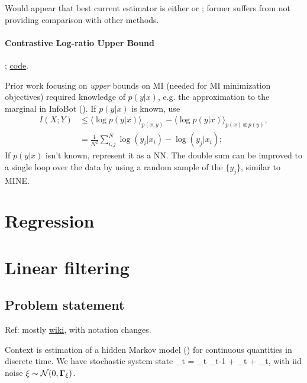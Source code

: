 \documentclass[notitlepage,openany,11pt]{report}
\numberwithin{equation}{section}
\theoremstyle{plain}%
\begin{document}
Would appear that best current estimator is either \cite{ChanEtAl:19} or \cite{ChoiLee:20}; former suffers from not providing comparison with other methods.

\subsubsection{Contrastive Log-ratio Upper Bound}
\cite{ChengEtAl:20}; \href{https://github.com/Linear95/CLUB}{code}.

Prior work focusing on \emph{upper} bounds on MI (needed for MI minimization objectives) required knowledge of $p(y|x)$, e.g. the approximation to the marginal in InfoBot (). If $p(y|x)$ is known, use
\begin{align*}
I(X;Y) &\leq \langle \log p(y|x) \rangle_{p(x,y)} - \langle \log p(y|x) \rangle_{p(x) \otimes p(y)}, \\
{} &= \frac{1}{N^2} \sum_{i,j}^{N} \log(y_i|x_i) - \log(y_j|x_i);
\end{align*}
If $p(y|x)$ isn't known, represent it as a NN. The double sum can be improved to a single loop over the data by using a random sample of the $\{ y_{j} \}$, similar to MINE. 




\chapter{Regression}






\chapter{Linear filtering}

\section{Problem statement}
Ref: mostly \href{https://en.wikipedia.org/wiki/Kalman_filter}{wiki}, with notation changes.

Context is estimation of a hidden Markov model () for continuous quantities in discrete time. We have stochastic system state 
\be
{}_{t} = _{t} _{t-1} +  _{t} + \xi_{t},
\ee
with iid noise $\xi \sim \mathcal{N}(0, \mathbf{\Gamma}_{\xi})$.
\end{document}
